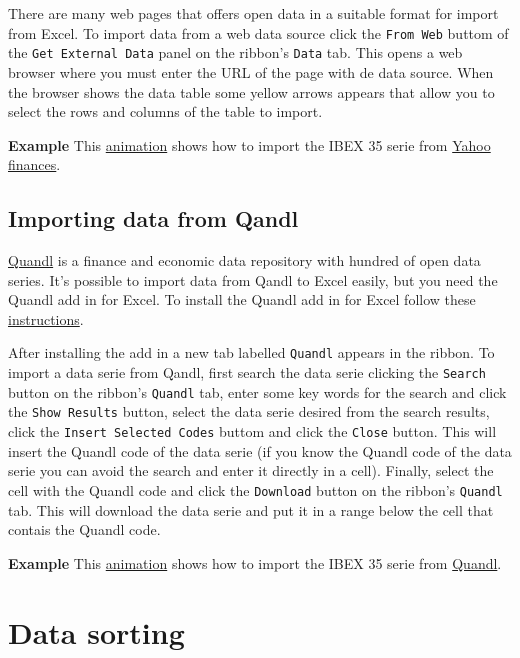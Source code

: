 There are many web pages that offers open data in a suitable format for import from Excel. To import data from a web data source click the \texttt{From Web} buttom of the \texttt{Get External Data} panel on the ribbon's \texttt{Data} tab. This opens a web browser where you must enter the URL of the page with de data source. When the browser shows the data table some yellow arrows appears that allow you to select the rows and columns of the table to import.

\textbf{Example} This \href{http://aprendeconalf.es/office/excel/manual/img/example_import_web.gif}{animation} shows how to import the IBEX 35 serie from \href{https://es.finance.yahoo.com/}{Yahoo finances}.

\subsection{Importing data from Qandl}\hypertarget{importing-data-from-qandl}{}\label{importing-data-from-qandl}

\href{https://www.quandl.com/}{Quandl} is a finance and economic data repository with hundred of open data series. It's possible to import data from Qandl to Excel easily, but you need the Quandl add in for Excel. To install the Quandl add in for Excel follow these \href{https://www.quandl.com/help/excel}{instructions}.

After installing the add in a new tab labelled \texttt{Quandl} appears in the ribbon. To import a data serie from Qandl, first search the data serie clicking the \texttt{Search} button on the ribbon's \texttt{Quandl} tab, enter some key words for the search and click the \texttt{Show Results} button, select the data serie desired from the search results, click the \texttt{Insert Selected Codes} buttom and click the \texttt{Close} button. This will insert the Quandl code of the data serie (if you know the Quandl code of the data serie you can avoid the search and enter it directly in a cell). Finally, select the cell with the Quandl code and click the \texttt{Download} button on the ribbon's \texttt{Quandl} tab. This will download the data serie and put it in a range below the cell that contais the Quandl code.

\textbf{Example} This \href{http://aprendeconalf.es/office/excel/manual/img/example_import_quandl.gif}{animation} shows how to import the IBEX 35 serie from \href{https://www.quandl.com/}{Quandl}.

\section{Data sorting}\hypertarget{data-sorting}{}\label{data-sorting}


